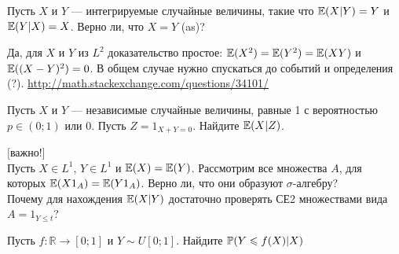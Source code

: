 \begin{problem}
 Пусть $X$ и $Y$ — интегрируемые случайные величины, такие что
$\E(X|Y)=Y$ и $\E(Y|X)=X$. Верно ли, что $X=Y$ (as)?

\begin{sol}
Да, для $X$ и $Y$ из $L^2$ доказательство простое: $\E(X^2)=\E(Y^2)=\E(XY)$ и $\E((X-Y)^2)=0$. В общем случае нужно спускаться до событий и определения (?).
\url{http://math.stackexchange.com/questions/34101/}

\end{sol}
\end{problem}

\begin{problem}
Пусть $X$ и $Y$ — независимые случайные величины, равные 1 с
вероятностью $p\in(0;1)$ или 0. Пусть $Z=1_{X+Y=0}$. Найдите
$\E(X|Z)$.

\begin{sol}

\end{sol}
\end{problem}

\begin{problem}
 $[$важно!$]$ \\
 Пусть $X\in L^{1}$, $Y\in L^{1}$ и $\E(X)=\E(Y)$.
Рассмотрим все множества $A$, для которых $\E(X 1_{A})=\E(Y 1_{A})$.
Верно ли, что
они образуют $\sigma$-алгебру? \\
Почему для нахождения $\E(X|Y)$ достаточно проверять СЕ2
множествами вида $A=1_{Y\le t}$?

\begin{sol}

\end{sol}
\end{problem}

\begin{problem}
Пусть $f:\mathbb{R}\rightarrow [0;1]$ и $Y\sim
U[0;1]$. Найдите $\P(Y\le f(X)|X)$

\begin{sol}

\end{sol}
\end{problem}

